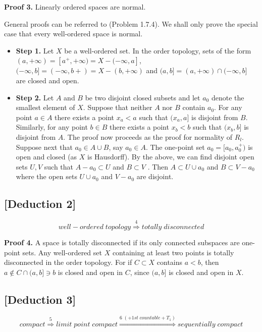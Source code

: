 \documentclass[11pt]{diazessay} %
\begin{document}
\vskip 10pt
\textbf{Proof 3.} Linearly ordered spaces are normal.

\vskip 3pt
General proofs can be referred to \cite{3} (Problem 1.7.4). We shall only prove the special case that every well-ordered space is normal. 
\begin{itemize}
	\item \textbf{Step 1.} Let $X$ be a well-ordered set. In the order topology, sets of the form $(a, +\infty) = [a^+, +\infty ) =
	X - (-\infty, a]$, $(-\infty, b] = (-\infty, b+) = X - (b, +\infty)$ and $(a, b] = (a, +\infty) \cap (-\infty, b]$ are closed and open.

	\vskip 5pt
	\item \textbf{Step 2.} Let $A$ and $B$ be two disjoint closed subsets and
	let $a_0$ denote the smallest element of $X$. Suppose that neither $A$ nor $B$ contain $a_0$. For any point $a \in A$
	there exists a point $x_a < a$ such that $(x_a, a]$ is disjoint from $B$. Similarly, for any point $b \in B$ there
	exists a point $x_b < b$ such that $(x_b, b]$ is disjoint from $A$. The proof now proceeds as the proof for
	normality of $R_l$. Suppose next that $a_0 \in A \cup B$, say $a_0 \in A$. The one-point set ${a_0} = [a_0, a^+_0 )$ is open
	and closed (as $X$ is Hausdorﬀ). By the above, we can ﬁnd disjoint open sets $U , V$ such that $A-{a_0} \subset U$
	and $B \subset V$ . Then $A \subset U \cup {a_0}$ and $B \subset V - {a_0}$ where the open sets $U \cup {a_0}$ and $V - {a_0}$ are
	disjoint.
\end{itemize}

\vskip 10pt
\subsection*{[Deduction 2]}
\vskip -10pt
\begin{equation}
	well-ordered \; topology \overset{4}{\Longrightarrow} totally \; disconnected
\end{equation}

\vskip 10pt
\textbf{Proof 4.} A space is totally disconnected if its only connected subspaces are one-point
sets. Any well-ordered set $X$ containing at least two points is totally disconnected in the order topology.
For if $C \subset X$ contains $a < b$, then $a \not\in C \cap (a, b] \ni b$ is closed and open in $C$, since $(a, b]$ is closed and open
in $X$.

\vskip 10pt
\subsection*{[Deduction 3]}
\vskip -10pt
\begin{equation}
	compact \overset{5}{\Longrightarrow} limit \; point \; compact \overset{6\; (+1st\; countable + T_1)}{\Longrightarrow} sequentially \; compact 
\end{equation}
\end{document}
